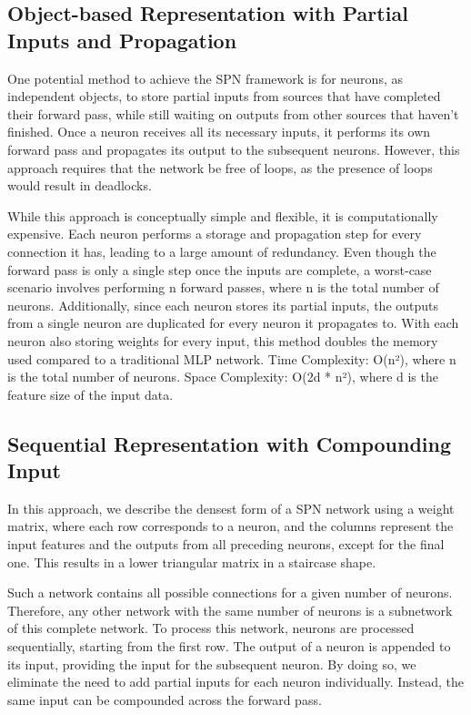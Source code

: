 \subsection{Object-based Representation with Partial Inputs and Propagation}
One potential method to achieve the SPN framework is for neurons, as independent objects, to store partial inputs from sources that have completed their forward pass, while still waiting on outputs from other sources that haven't finished. Once a neuron receives all its necessary inputs, it performs its own forward pass and propagates its output to the subsequent neurons. However, this approach requires that the network be free of loops, as the presence of loops would result in deadlocks. 
 
While this approach is conceptually simple and flexible, it is computationally expensive. Each neuron performs a storage and propagation step for every connection it has, leading to a large amount of redundancy. Even though the forward pass is only a single step once the inputs are complete, a worst-case scenario involves performing n forward passes, where n is the total number of neurons. Additionally, since each neuron stores its partial inputs, the outputs from a single neuron are duplicated for every neuron it propagates to. With each neuron also storing weights for every input, this method doubles the memory used compared to a traditional MLP network.
Time Complexity: O(n²), where n is the total number of neurons.
Space Complexity: O(2d * n²), where d is the feature size of the input data.


\subsection{Sequential Representation with Compounding Input}

In this approach, we describe the densest form of a SPN network using a weight matrix, where each row corresponds to a neuron, and the columns represent the input features and the outputs from all preceding neurons, except for the final one. This results in a lower triangular matrix in a staircase shape.
 
Such a network contains all possible connections for a given number of neurons. Therefore, any other network with the same number of neurons is a subnetwork of this complete network. To process this network, neurons are processed sequentially, starting from the first row. The output of a neuron is appended to its input, providing the input for the subsequent neuron. By doing so, we eliminate the need to add partial inputs for each neuron individually. Instead, the same input can be compounded across the forward pass.

